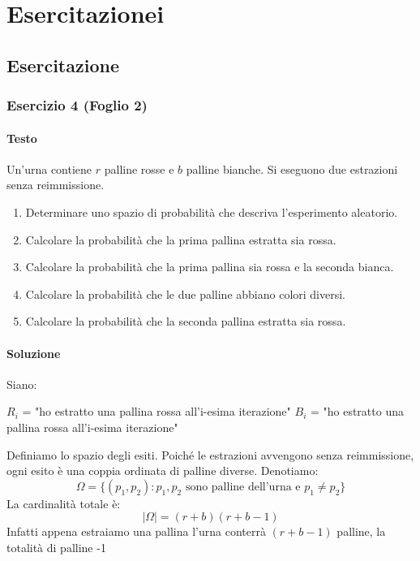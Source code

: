 \chapter{Esercitazionei}

\section{Esercitazione}
\subsection{Esercizio 4 (Foglio 2)}
\subsubsection{Testo}
Un’urna contiene \(r\) palline rosse e \(b\) palline bianche. Si eseguono due estrazioni senza reimmissione.
\begin{enumerate}[label=(\alph*)]
    \item Determinare uno spazio di probabilità che descriva l’esperimento aleatorio.
    \item Calcolare la probabilità che la prima pallina estratta sia rossa.
    \item Calcolare la probabilità che la prima pallina sia rossa e la seconda bianca.
    \item Calcolare la probabilità che le due palline abbiano colori diversi.
    \item Calcolare la probabilità che la seconda pallina estratta sia rossa.
\end{enumerate}

\subsubsection{Soluzione}
Siano:

$R_i$ = "ho estratto una pallina rossa all'i-esima iterazione"
$B_i$ = "ho estratto una pallina rossa all'i-esima iterazione"

Definiamo lo spazio degli esiti. Poiché le estrazioni avvengono senza reimmissione, ogni esito è una coppia ordinata di palline diverse. Denotiamo:
\[
    \Omega = \{ (p_1, p_2) : p_1, p_2 \text{ sono palline dell'urna e } p_1 \neq p_2 \}
\]
La cardinalità totale è:
\[
    |\Omega| = (r+b)(r+b-1)
\]
Infatti appena estraiamo una pallina l'urna conterrà $(r+b-1)$ palline, la totalità di palline -1

